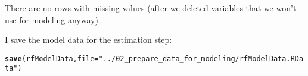 \documentclass{article}\usepackage[]{graphicx}\usepackage[]{color}
\makeatletter
\newcommand{\hlstr}[1]{\textcolor[rgb]{0.192,0.494,0.8}{#1}}%
\newcommand{\hlstd}[1]{\textcolor[rgb]{0.345,0.345,0.345}{#1}}%
\newcommand{\hlkwc}[1]{\textcolor[rgb]{0.333,0.667,0.333}{#1}}%
\newcommand{\hlkwd}[1]{\textcolor[rgb]{0.737,0.353,0.396}{\textbf{#1}}}%
\newenvironment{kframe}{%
 \def\at@end@of@kframe{}%
 \ifinner\ifhmode%
  \def\at@end@of@kframe{\end{minipage}}%
  \begin{minipage}{\columnwidth}%
 \fi\fi%
 \def\FrameCommand##1{\hskip\@totalleftmargin \hskip-\fboxsep
 \colorbox{shadecolor}{##1}\hskip-\fboxsep
     \hskip-\linewidth \hskip-\@totalleftmargin \hskip\columnwidth}%
 \MakeFramed {\advance\hsize-\width
   \@totalleftmargin\z@ \linewidth\hsize
   \@setminipage}}%
 {\par\unskip\endMakeFramed%
 \at@end@of@kframe}
\newenvironment{knitrout}{}{} %
\makeatother
\begin{document}
There are no rows with missing values (after we deleted variables that we won't use for modeling anyway).

I save the model data for the estimation step:
\begin{knitrout}
\color{fgcolor}\begin{kframe}
\begin{alltt}
\hlkwd{save}\hlstd{(rfModelData,} \hlkwc{file}\hlstd{=}\hlstr{"../02_prepare_data_for_modeling/rfModelData.RData"}\hlstd{)}
\end{alltt}
\end{kframe}
\end{knitrout}
\end{document}

